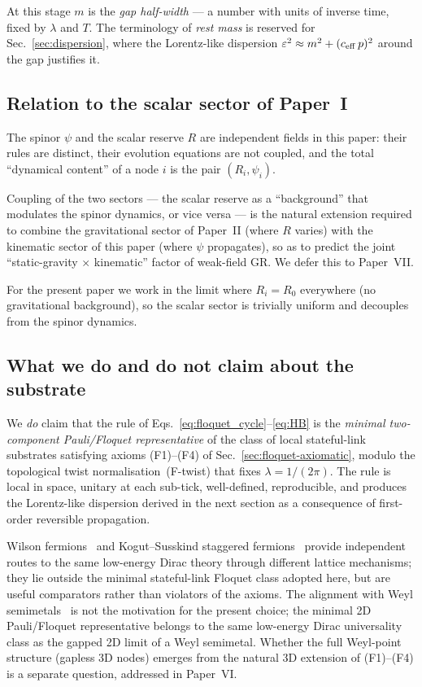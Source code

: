 \documentclass[11pt,a4paper]{article}
\begin{document}
At this stage $m$ is the \emph{gap half-width} --- a number
with units of inverse time, fixed by $\lambda$ and $T$. The
terminology of \emph{rest mass} is reserved for
Sec.~\ref{sec:dispersion}, where the Lorentz-like dispersion
$\varepsilon^2 \approx m^2 + (c_{\rm eff}\,p)^2$ around the gap
justifies it.

\subsection{Relation to the scalar sector of Paper~I}

The spinor $\psi$ and the scalar reserve $R$ are independent
fields in this paper: their rules are distinct, their evolution
equations are not coupled, and the total ``dynamical content''
of a node $i$ is the pair $(R_i, \psi_i)$.

Coupling of the two sectors --- the scalar reserve as a
``background'' that modulates the spinor dynamics, or vice
versa --- is the natural extension required to combine the
gravitational sector of Paper~II (where $R$ varies) with the
kinematic sector of this paper (where $\psi$ propagates), so as
to predict the joint ``static-gravity $\times$ kinematic''
factor of weak-field GR. We defer this to Paper~VII.

For the present paper we work in the limit where $R_i = R_0$
everywhere (no gravitational background), so the scalar sector
is trivially uniform and decouples from the spinor dynamics.

\subsection{What we do and do not claim about the substrate}

We \emph{do} claim that the rule of
Eqs.~\eqref{eq:floquet_cycle}--\eqref{eq:HB} is the
\emph{minimal two-component Pauli/Floquet representative} of
the class of local stateful-link substrates satisfying axioms
(F1)--(F4) of Sec.~\ref{sec:floquet-axiomatic}, modulo the
topological twist normalisation~(F-twist) that fixes
$\lambda = 1/(2\pi)$. The rule is local in space, unitary at
each sub-tick, well-defined, reproducible, and produces the
Lorentz-like dispersion derived in the next section as a
consequence of first-order reversible propagation.

Wilson fermions~\cite{wilson1974} and Kogut--Susskind staggered
fermions~\cite{kogut1975} provide independent routes to the
same low-energy Dirac theory through different lattice
mechanisms; they lie outside the minimal stateful-link Floquet
class adopted here, but are useful comparators rather than
violators of the axioms. The alignment with Weyl
semimetals~\cite{wan2011, armitage2018} is not the motivation
for the present choice; the minimal 2D Pauli/Floquet
representative belongs to the same low-energy Dirac
universality class as the gapped 2D limit of a Weyl semimetal.
Whether the full Weyl-point structure (gapless 3D nodes)
emerges from the natural 3D extension of (F1)--(F4) is a
separate question, addressed in Paper~VI.
\end{document}
